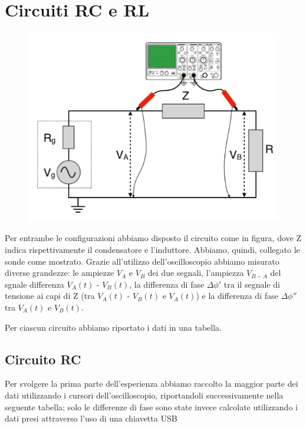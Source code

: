 \section{Circuiti RC e RL}

\begin{figure}[H]
    \centering
    \includegraphics[scale=0.5]{Immagini/RC.PNG}
    \caption{}
\end{figure}


Per entrambe le configurazioni abbiamo disposto il circuito come in figura, dove Z indica rispettivamente il condensatore e l'induttore. Abbiamo, quindi, collegato le sonde come mostrato.
Grazie all'utilizzo dell'oscilloscopio abbiamo misurato diverse grandezze: le ampiezze $V_{A}$ e $V_{B}$ dei due segnali, l'ampiezza $V_{B-A}$ del sgnale differenza $V_{A}(t)$ - $V_{B}(t)$, la differenza di fase $\Delta \phi'$ tra il segnale di tensione ai capi di Z (tra $V_{A}(t)$ - $V_{B}(t)$ e $V_{A}(t)$) e la differenza di fase $\Delta \phi''$ tra $V_{A}(t)$ e $V_{B}(t)$.

Per ciascun circuito abbiamo riportato i dati in una tabella.

\subsection{Circuito RC}
Per svolgere la prima parte dell’esperienza abbiamo raccolto la maggior parte dei dati utilizzando i cursori dell’oscilloscopio, riportandoli successivamente nella seguente tabella; solo le differenze di fase sono state invece calcolate utilizzando i dati presi attraverso l'uso di una chiavetta USB

